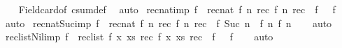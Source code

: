 \begin{isabellebody}
%
\isadelimproof
\ \ %
\endisadelimproof
%
\isatagproof
{}\isamarkupfalse%
\ Field{\isacharunderscore}{\kern0pt}card{\isacharunderscore}{\kern0pt}of\ csum{\isacharunderscore}{\kern0pt}def\ \isamarkupfalse%
\ auto%
\endisatagproof
{\isafoldproof}%
%
\isadelimproof
\isanewline
%
\endisadelimproof
\isanewline
{}\isamarkupfalse%
\ rec{\isacharunderscore}{\kern0pt}nat{\isacharunderscore}{\kern0pt}{}{\isacharunderscore}{\kern0pt}imp{\isacharcolon}{\kern0pt}\ {\isachardoublequoteopen}f\ {\isacharequal}{\kern0pt}\ rec{\isacharunderscore}{\kern0pt}nat\ f{}\ {\isacharparenleft}{\kern0pt}{\isasymlambda}n\ rec{\isachardot}{\kern0pt}\ f{}\ n\ rec{\isacharparenright}{\kern0pt}\ {\isasymLongrightarrow}\ f\ {}\ {\isacharequal}{\kern0pt}\ f{}{\isachardoublequoteclose}\isanewline
%
\isadelimproof
\ \ %
\endisadelimproof
%
\isatagproof
{}\isamarkupfalse%
\ auto%
\endisatagproof
{\isafoldproof}%
%
\isadelimproof
\isanewline
%
\endisadelimproof
\isanewline
{}\isamarkupfalse%
\ rec{\isacharunderscore}{\kern0pt}nat{\isacharunderscore}{\kern0pt}Suc{\isacharunderscore}{\kern0pt}imp{\isacharcolon}{\kern0pt}\ {\isachardoublequoteopen}f\ {\isacharequal}{\kern0pt}\ rec{\isacharunderscore}{\kern0pt}nat\ f{}\ {\isacharparenleft}{\kern0pt}{\isasymlambda}n\ rec{\isachardot}{\kern0pt}\ f{}\ n\ rec{\isacharparenright}{\kern0pt}\ {\isasymLongrightarrow}\ f\ {\isacharparenleft}{\kern0pt}Suc\ n{\isacharparenright}{\kern0pt}\ {\isacharequal}{\kern0pt}\ f{}\ n\ {\isacharparenleft}{\kern0pt}f\ n{\isacharparenright}{\kern0pt}{\isachardoublequoteclose}\isanewline
%
\isadelimproof
\ \ %
\endisadelimproof
%
\isatagproof
{}\isamarkupfalse%
\ auto%
\endisatagproof
{\isafoldproof}%
%
\isadelimproof
\isanewline
%
\endisadelimproof
\isanewline
{}\isamarkupfalse%
\ rec{\isacharunderscore}{\kern0pt}list{\isacharunderscore}{\kern0pt}Nil{\isacharunderscore}{\kern0pt}imp{\isacharcolon}{\kern0pt}\ {\isachardoublequoteopen}f\ {\isacharequal}{\kern0pt}\ rec{\isacharunderscore}{\kern0pt}list\ f{}\ {\isacharparenleft}{\kern0pt}{\isasymlambda}x\ xs\ rec{\isachardot}{\kern0pt}\ f{}\ x\ xs\ rec{\isacharparenright}{\kern0pt}\ {\isasymLongrightarrow}\ f\ {\isacharbrackleft}{\kern0pt}{\isacharbrackright}{\kern0pt}\ {\isacharequal}{\kern0pt}\ f{}{\isachardoublequoteclose}\isanewline
%
\isadelimproof
\ \ %
\endisadelimproof
%
\isatagproof
{}\isamarkupfalse%
\ auto%
\endisatagproof

\end{isabellebody}
